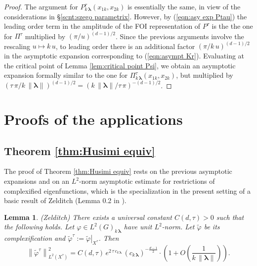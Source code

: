 \documentclass[12pt,a4paper]{article}
\theoremstyle{plain}
\newtheorem{lem}[thm]{Lemma}%
\theoremstyle{definition}
\begin{document}
\begin{proof}
The argument for
 $P^\tau_{k\,\boldsymbol{\lambda}}(x_{1k},x_{2k})$ is essentially the same,
 in view of the considerations in \S \ref{scnt:szego parametrix}.
However, by (\ref{eqn:asy exp Ptau}) the leading order term in the amplitude
of the FOI representation of $P^\tau$ is the the one for $\Pi^\tau$
multiplied by $(\pi/u)^{(d-1)/2}$.
Since the previous arguments involve the rescaling $u\mapsto k\,u$,
to leading order
there is an additional factor $(\pi/k\,u)^{(d-1)/2}$ in the asymptotic expansion corresponding to (\ref{eqn:asympt Kr}). 
Evaluating at the critical point
of Lemma \ref{lem:critical point Psi}, we obtain
an asymptotic expansion formally similar to the one for $\Pi^\tau_{k\,\boldsymbol{\lambda}}(x_{1k},x_{2k})$, but multiplied by 
$(\tau\,\pi/k\,\|\boldsymbol{\lambda}\|)^{(d-1)/2}=
(k\,\|\boldsymbol{\lambda}\|/\tau\,\pi)^{-(d-1)/2}$. 
\end{proof}



\section{Proofs of the applications}

\subsection{Theorem \ref{thm:Husimi equiv}}

The proof of Theorem \ref{thm:Husimi equiv} rests on the previous
asymptotic expansions and on an $L^2$-norm
asymptotic estimate for restrictions of complexified eigenfunctions, 
which is the specialization in the present setting of a basic result of Zelditch 
(Lemma 0.2 in \cite{z20}).

\begin{lem} (Zelditch)
\label{lem:L2 norm est zel}
There exists a universal constant $C(d,\tau)>0$ such that the following holds.
Let $\varphi\in L^2(G)_{k\,\boldsymbol{\lambda}}$ 
have unit $L^2$-norm. Let $\tilde{\varphi}$ be its complexification and
$\tilde{\varphi}^\tau:=\left.\tilde{\varphi}\right|_{X^\tau}$.
Then
$$
\left\|\tilde{\varphi}^\tau\right\|^2_{L^2(X^\tau)}
=C(d,\tau)\,e^{2\,\tau\,c_{k\,\boldsymbol{\lambda}}}\,(c_{k\,\boldsymbol{\lambda}})^{-\frac{d-1}{2}}\cdot 
\left(1+O\left(\frac{1}{k\,\|\boldsymbol{\lambda}\|}\right)\right).
$$
\end{lem}
\end{document}
